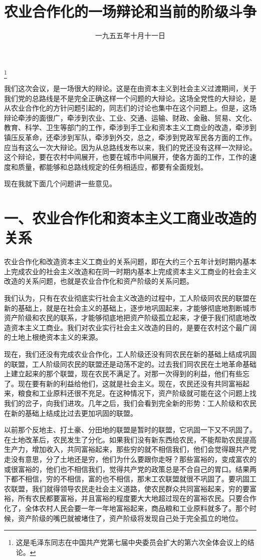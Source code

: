 
\title{农业合作化的一场辩论和当前的阶级斗争}
\date{一九五五年十月十一日}
\thanks{这是毛泽东同志在中国共产党第七届中央委员会扩大的第六次全体会议上的结论。}
\maketitle


我们这次会议，是一场很大的辩论。这是在由资本主义到社会主义过渡期间，关于我们党的总路线是不是完全正确这样一个问题的大辩论。这场全党性的大辩论，是从农业合作化的方针问题引起的，同志们的讨论也集中在这个问题上。但是，这场辩论牵涉的面很广，牵涉到农业、工业、交通、运输、财政、金融、贸易、文化、教育、科学、卫生等部门的工作，牵涉到手工业和资本主义工商业的改造，牵涉到镇压反革命，还牵涉到军队，牵涉到外交，总之，牵涉到党政军民各方面的工作。应当有这么一次大辩论。因为从总路线发布以来，我们的党还没有这样一次辩论。这个辩论，要在农村中间展开，也要在城市中间展开，使各方面的工作，工作的速度和质量，都能够和总路线规定的任务相适应，都要有全面规划。

现在我就下面几个问题讲一些意见。

\section{一、农业合作化和资本主义工商业改造的关系}

农业合作化和改造资本主义工商业的关系问题，即在大约三个五年计划时期内基本上完成农业的社会主义改造和在同一时期内基本上完成资本主义工商业的社会主义改造的关系问题，也就是农业合作化和资产阶级的关系问题。

我们认为，只有在农业彻底实行社会主义改造的过程中，工人阶级同农民的联盟在新的基础上，就是在社会主义的基础上，逐步地巩固起来，才能够彻底地割断城市资产阶级和农民的联系，才能够彻底地把资产阶级孤立起来，才便于我们彻底地改造资本主义工商业。我们对农业实行社会主义改造的目的，是要在农村这个最广阔的土地上根绝资本主义的来源。

现在，我们还没有完成农业合作化，工人阶级还没有同农民在新的基础上结成巩固的联盟，工人阶级同农民的联盟还是动荡不定的。过去我们同农民在土地革命基础上建立起来的那个联盟，现在农民不满足了。对那一次得到的利益，他们有些忘了。现在要有新的利益给他们，这就是社会主义。现在，农民还没有共同富裕起来，粮食和工业原料还很不充足。在这种情况下，资产阶级就可能在这个问题上找我们的岔子，向我们进攻。几年之后，我们会看到完全新的形势：工人阶级和农民在新的基础上结成比过去更加巩固的联盟。

以前那个反地主、打土豪、分田地的联盟是暂时的联盟，它巩固一下又不巩固了。在土地改革后，农民发生了分化。如果我们没有新东西给农民，不能帮助农民提高生产力，增加收入，共同富裕起来，那些穷的就不相信我们，他们会觉得跟共产党走没有意思，分了土地还是穷，他们为什么要跟你走呀？那些富裕的，变成富农的或很富裕的，他们也不相信我们，觉得共产党的政策总是不合自己的胃口。结果两下都不相信，穷的不相信，富的也不相信，那末工农联盟就很不巩固了。要巩固工农联盟，我们就得领导农民走社会主义道路，使农民群众共同富裕起来，穷的要富裕，所有农民都要富裕，并且富裕的程度要大大地超过现在的富裕农民。只要合作化了，全体农村人民会要一年一年地富裕起来，商品粮和工业原料就多了。那个时候，资产阶级的嘴巴就被堵住了，资产阶级将发现自己处于完全孤立的地位。

